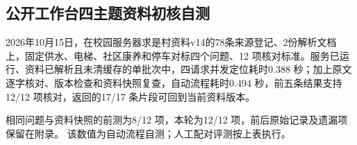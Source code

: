 \subsection{公开工作台四主题资料初核自测}
2026年10月15日，在校园服务器求是村资料v14的78条来源登记、2份解析文档上，固定供水、电梯、社区康养和停车对标四个问题、12 项核对标准。服务已运行、资料已解析且未清缓存的单批次中，四请求并发定位耗时0.388 秒；加上原文逐字核对、版本检查和资料快照复查，自动流程耗时0.494 秒，前五条结果支持12/12 项核对，返回的17/17 条片段可回到当前资料版本。

相同问题与资料快照的前测为8/12 项，本轮为12/12 项，前后原始记录及遗漏项保留在附录。 该数值为自动流程自测；人工配对评测按上表执行。
